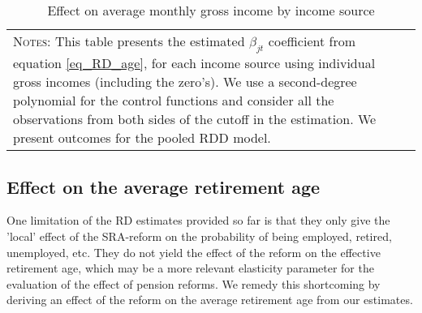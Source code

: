 \documentclass[12pt,a4paper]{article}
\begin{document}
\begin{table}[!t]	
\caption{Effect on average monthly gross income by income source}
\footnotesize
\label{table_RD_government_budget}
\begin{adjustbox}{max width = \textwidth, max totalheight=.7\textheight, keepaspectratio}
	\hspace*{-1cm}
	
	\hspace*{-1cm}
\end{adjustbox}
\vspace*{0.2cm}
\scriptsize
\begin{tabular}{ll}
\begin{minipage}{13cm}%
	\textsc{Notes:}  This table presents the estimated $\beta_{jt}$ coefficient from equation \ref{eq_RD_age}, for each income source using individual gross incomes (including the zero's). We use a second-degree polynomial for the control functions and consider all the observations from both sides of the cutoff in the estimation. We present outcomes for the pooled RDD model.
\end{minipage}%
\end{tabular}
\normalsize
\end{table}



\subsection{Effect on the average retirement age}

One limitation of the RD estimates provided so far is that they only give the 'local' effect of the SRA-reform on the probability of being employed, retired, unemployed, etc. They do not yield the effect of the reform on the effective retirement age, which may be a more relevant elasticity parameter for the evaluation of the effect of pension reforms. We remedy this shortcoming by deriving an effect of the reform on the average retirement age from our estimates. 
\end{document}

